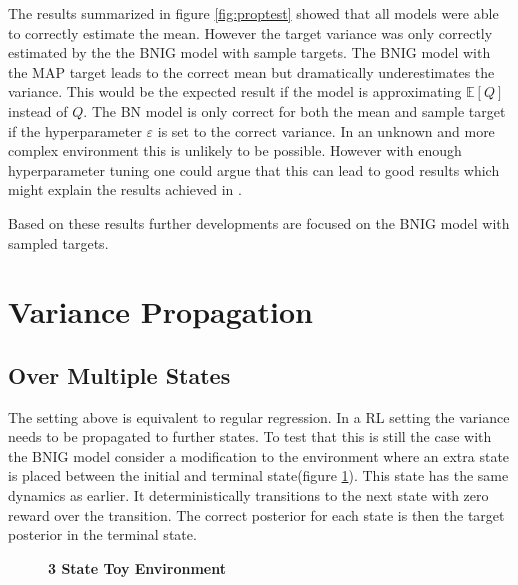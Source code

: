 The results summarized in figure \ref{fig:proptest} showed that all models were able to correctly estimate the mean. However the target variance was only correctly estimated by the the BNIG model with sample targets. The BNIG model with the MAP target leads to the correct mean but dramatically underestimates the variance. This would be the expected result if the model is approximating $\mathbb{E}[Q]$ instead of $Q$. The BN model is only correct for both the mean and sample target if the hyperparameter $\varepsilon$ is set to the correct variance. In an unknown and more complex environment this is unlikely to be possible. However with enough hyperparameter tuning one could argue that this can lead to good results which might explain the results achieved in \cite{azziz_2018}.

Based on these results further developments are focused on the BNIG model with sampled targets.

\section{Variance Propagation}

\subsection{Over Multiple States}

The setting above is equivalent to regular regression. In a RL setting the variance needs to be propagated to further states. To test that this is still the case with the BNIG model consider a modification to the environment where an extra state is placed between the initial and terminal state(figure \ref{fig:3state}). This state has the same dynamics as earlier. It deterministically transitions to the next state with zero reward over the transition. The correct posterior for each state is then the target posterior in the terminal state. 

\begin{figure}[H]
    \centering
    \caption{\textbf{3 State Toy Environment}}
    \label{fig:3state}
\end{figure}



